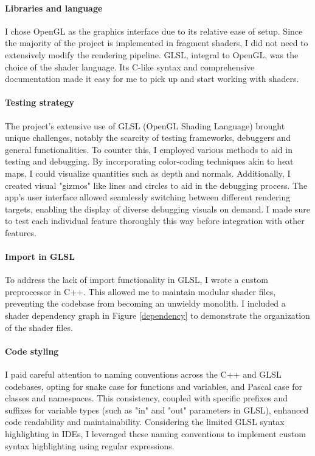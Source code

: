 \paragraph{Libraries and language}
I chose OpenGL as the graphics interface due to its relative ease of setup. Since the majority of the project is implemented in fragment shaders, I did not need to extensively modify the rendering pipeline. GLSL, integral to OpenGL, was the choice of the shader language. Its C-like syntax and comprehensive documentation made it easy for me to pick up and start working with shaders.

\paragraph{Testing strategy}
The project's extensive use of GLSL (OpenGL Shading Language) brought unique challenges, notably the scarcity of testing frameworks, debuggers and general functionalities. To counter this, I employed various methods to aid in testing and debugging. By incorporating color-coding techniques akin to heat maps, I could visualize quantities such as depth and normals. Additionally, I created visual "gizmos" like lines and circles to aid in the debugging process. The app's user interface allowed seamlessly switching between different rendering targets, enabling the display of diverse debugging visuals on demand. I made sure to test each individual feature thoroughly this way before integration with other features.

\paragraph{Import in GLSL}
To address the lack of import functionality in GLSL, I wrote a custom preprocessor in C++. This allowed me to maintain modular shader files, preventing the codebase from becoming an unwieldy monolith. I included a shader dependency graph in Figure \ref{dependency} to demonstrate the organization of the shader files.

\paragraph{Code styling}
I paid careful attention to naming conventions across the C++ and GLSL codebases, opting for snake case for functions and variables, and Pascal case for classes and namespaces. This consistency, coupled with specific prefixes and suffixes for variable types (such as "in" and "out" parameters in GLSL), enhanced code readability and maintainability. Considering the limited GLSL syntax highlighting in IDEs, I leveraged these naming conventions to implement custom syntax highlighting using regular expressions.

